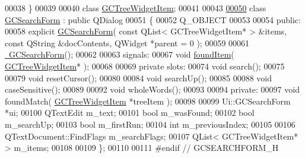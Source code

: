 \begin{DoxyCode}
00038 \}
00039 
00040 \textcolor{keyword}{class }\hyperlink{class_g_c_tree_widget_item}{GCTreeWidgetItem};
00041 
00043 
\hypertarget{gcsearchform_8h_source_l00050}{}\hyperlink{class_g_c_search_form}{00050} \textcolor{keyword}{class }\hyperlink{class_g_c_search_form}{GCSearchForm} : \textcolor{keyword}{public} QDialog
00051 \{
00052   Q\_OBJECT
00053   
00054 \textcolor{keyword}{public}:
00058   \textcolor{keyword}{explicit} \hyperlink{class_g_c_search_form_a3e8731704cbe2cc86957af8aa6d7c17a}{GCSearchForm}( \textcolor{keyword}{const} QList< GCTreeWidgetItem* > &items, \textcolor{keyword}{const} QString
       &docContents, QWidget *parent = 0 );
00059 
00061   \hyperlink{class_g_c_search_form_a27023a33b05baafe5d41cfb738985688}{~GCSearchForm}();
00062 
00063 signals:
00067   \textcolor{keywordtype}{void} \hyperlink{class_g_c_search_form_a275c8071b3e054236f90d979da26d084}{foundItem}( \hyperlink{class_g_c_tree_widget_item}{GCTreeWidgetItem}* );
00068 
00069 \textcolor{keyword}{private} slots:
00074   \textcolor{keywordtype}{void} search();
00075 
00079   \textcolor{keywordtype}{void} resetCursor();
00080 
00084   \textcolor{keywordtype}{void} searchUp();
00085 
00088   \textcolor{keywordtype}{void} caseSensitive();
00089 
00092   \textcolor{keywordtype}{void} wholeWords();
00093   
00094 \textcolor{keyword}{private}:
00097   \textcolor{keywordtype}{void} foundMatch( \hyperlink{class_g_c_tree_widget_item}{GCTreeWidgetItem} *treeItem );
00098 
00099   Ui::GCSearchForm *ui;
00100   QTextEdit         m\_text;
00101   \textcolor{keywordtype}{bool}              m\_wasFound;
00102   \textcolor{keywordtype}{bool}              m\_searchUp;
00103   \textcolor{keywordtype}{bool}              m\_firstRun;
00104   \textcolor{keywordtype}{int}               m\_previousIndex;
00105 
00106   QTextDocument::FindFlags m\_searchFlags;
00107   QList< GCTreeWidgetItem* > m\_items;
00108 
00109 \};
00110 
00111 \textcolor{preprocessor}{#endif // GCSEARCHFORM\_H}
\end{DoxyCode}
